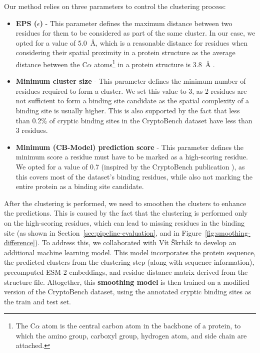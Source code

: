 Our method relies on three parameters to control the clustering process:
\begin{itemize}
    \item \textbf{EPS ($\epsilon$)} - This parameter defines the maximum distance between two residues for them to be considered as part of the same cluster. In our case, we opted for a value of 5.0~\AA, which is a reasonable distance for residues when considering their spatial proximity in a protein structure as the average distance between the C$\alpha$ atoms\footnote{The C$\alpha$ atom is the central carbon atom in the backbone of a protein, to which the amino group, carboxyl group, hydrogen atom, and side chain are attached.} in a protein structure is 3.8~\AA{} \cite{creighton1993proteins}.
    \item \textbf{Minimum cluster size} - This parameter defines the minimum number of residues required to form a cluster. We set this value to 3, as 2 residues are not sufficient to form a binding site candidate as the spatial complexity of a binding site is usually higher. This is also supported by the fact that less than 0.2\% of cryptic binding sites in the CryptoBench dataset have less than 3 residues.
    \item \textbf{Minimum (CB-Model) prediction score} - This parameter defines the minimum score a residue must have to be marked as a high-scoring residue. We opted for a value of 0.7 (inspired by the CryptoBench publication \cite{vskrhak2025cryptobench}), as this covers most of the dataset's binding residues, while also not marking the entire protein as a binding site candidate.
\end{itemize}

After the clustering is performed, we need to smoothen the clusters to enhance the predictions. This is caused by the fact that the clustering is performed only on the high-scoring residues, which can lead to missing residues in the binding site (as shown in Section~\ref{sec:pipeline-evaluation}, and in Figure~\ref{fig:smoothing-difference}). To address this, we collaborated with Vít Škrhák to develop an additional machine learning model. This model incorporates the protein sequence, the predicted clusters from the clustering step (along with sequence information), precomputed ESM-2 embeddings, and residue distance matrix derived from the structure file. Altogether, this \textbf{smoothing model} is then trained on a modified version of the CryptoBench dataset, using the annotated cryptic binding sites as the train and test set.

